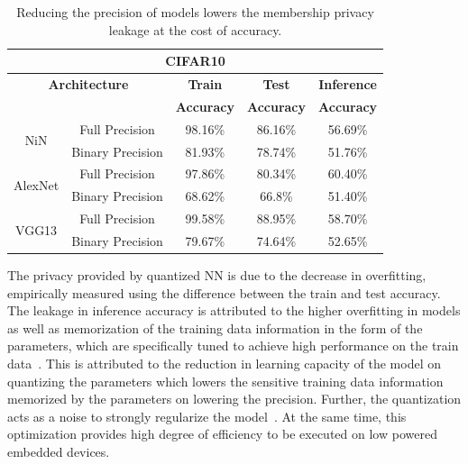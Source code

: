 \begin{table}[t]
\begin{center}
\renewcommand\arraystretch{1.5}
\fontsize{6.5pt}{6.5pt}\selectfont
\begin{tabular}{|c|c|c|c|c|}
\hline
\multicolumn{5}{|c|}{\textbf{CIFAR10}} \\
\hline
\multicolumn{2}{|c|}{\textbf{Architecture}} & \textbf{Train}  & \textbf{Test}  & \textbf{Inference}  \\
 \multicolumn{2}{|c|}{} & \textbf{Accuracy} & \textbf{Accuracy} & \textbf{Accuracy}  \\
\hline
\multirow{2}{*}{NiN} & Full Precision & 98.16\% & 86.16\% & \cellcolor{red!25}56.69\% \\
& Binary Precision & 81.93\% & 78.74\% & \cellcolor{green!25}51.76\% \\
\hline
\multirow{2}{*}{AlexNet} & Full Precision & 97.86\% & 80.34\% & \cellcolor{red!25}60.40\% \\
& Binary Precision & 68.62\% & 66.8\% & \cellcolor{green!25}51.40\% \\
\hline
\multirow{2}{*}{VGG13} & Full Precision & 99.58\% & 88.95\% & \cellcolor{red!25}58.70\%\\
& Binary Precision & 79.67\% & 74.64\% & \cellcolor{green!25}52.65\%\\
\hline
\end{tabular}
\end{center}
\caption{Reducing the precision of models lowers the membership privacy leakage at the cost of accuracy.}
\label{cifar10quant}
\vspace{-2mm}
\end{table}



The privacy provided by quantized NN is due to the decrease in overfitting, empirically measured using the difference between the train and test accuracy.
The leakage in inference accuracy is attributed to the higher overfitting in models as well as memorization of the training data information in the form of the parameters, which are specifically tuned to achieve high performance on the train data~\cite{10.1145/3133956.3134077,236216,DBLP:journals/corr/abs-1812-00910}.
This is attributed to the reduction in learning capacity of the model on quantizing the parameters which lowers the sensitive training data information memorized by the parameters on lowering the precision.
Further, the quantization acts as a noise to strongly regularize the model~\cite{NIPS2016_6573}.
At the same time, this optimization provides high degree of efficiency to be executed on low powered embedded devices.

